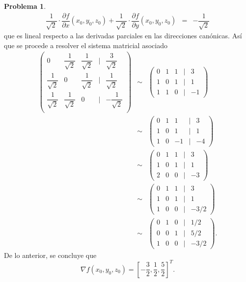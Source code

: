\documentclass[12pt,letterpaper]{article}
\theoremstyle{definition}
\newtheorem{problm}{Problema}
\begin{document}
\begin{problm}
\begin{eqnarray*}
		\dfrac{1}{\sqrt{2}} \cdot \dfrac{\partial f}{\partial x}(x_0,y_0, z_0) + \dfrac{1}{\sqrt{2}} \cdot \dfrac{\partial f}{\partial y}(x_0,y_0, z_0) & = & -\dfrac{1}{\sqrt{2}}
	\end{eqnarray*}
	que es lineal respecto a las derivadas parciales en las direcciones canónicas. Así que se procede a resolver el sistema matricial asociado
	\begin{eqnarray*}
		\left( \begin{matrix}
			           0         & \dfrac{1}{\sqrt{2}} & \dfrac{1}{\sqrt{2}} & | & \dfrac{3}{\sqrt{2}} \\
			 \dfrac{1}{\sqrt{2}} &         0           & \dfrac{1}{\sqrt{2}} & | & \dfrac{1}{\sqrt{2}} \\
			 \dfrac{1}{\sqrt{2}} & \dfrac{1}{\sqrt{2}} &        0            & | & -\dfrac{1}{\sqrt{2}} \\
		\end{matrix} \right) & \sim &
		\left( \begin{matrix}
			0 & 1 & 1 & | & 3 \\
			1 & 0 & 1 & | & 1 \\
			1 & 1 &  0 &| & -1 
		\end{matrix} \right) \\
							& \sim &
							\left( \begin{matrix}
								0 & 1 &  1 & | & 3 \\
								1 & 0 &  1 & | & 1 \\
								1 & 0 & -1 & | & -4 
							\end{matrix} \right) \\
						    & \sim &
						    \left( \begin{matrix}
						    	0 & 1 & 1 & | & 3 \\
						    	1 & 0 & 1 & | & 1 \\
						    	2 & 0 & 0 & | & -3 
						    \end{matrix} \right) \\
					        & \sim &
					        \left( \begin{matrix}
					        	0 & 1 & 1 & | & 3 \\
					        	1 & 0 & 1 & | & 1 \\
					        	1 & 0 & 0 & | & -3/2 
					        \end{matrix} \right) \\
				            & \sim &
			                \left( \begin{matrix}
			                	0 & 1 & 0 & | & 1/2 \\
			                	0 & 0 & 1 & | & 5/2 \\
			                	1 & 0 & 0 & | & -3/2 
			                \end{matrix} \right).
	\end{eqnarray*}
	De lo anterior, se concluye que
	\[ \nabla f (x_0, y_0, z_0) = \left[ -\dfrac{3}{2}, \dfrac{1}{2}, \dfrac{5}{2} \right]^T. \]
\end{problm}
\end{document}
